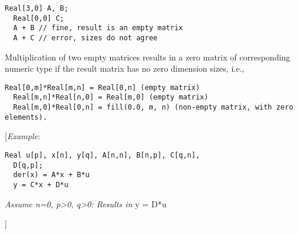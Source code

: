\begin{lstlisting}[language=modelica]
  Real[3,0] A, B;
  Real[0,0] C;
  A + B // fine, result is an empty matrix
  A + C // error, sizes do not agree
\end{lstlisting}
Multiplication of two empty matrices results in a zero matrix of
corresponding numeric type if the result matrix has no zero dimension
sizes, i.e.,

\begin{lstlisting}[language=modelica]
  Real[0,m]*Real[m,n] = Real[0,n] (empty matrix)
  Real[m,n]*Real[n,0] = Real[m,0] (empty matrix)
  Real[m,0]*Real[0,n] = fill(0.0, m, n) (non-empty matrix, with zero elements).
\end{lstlisting}
{[}\emph{Example}:

\begin{lstlisting}[language=modelica]
  Real u[p], x[n], y[q], A[n,n], B[n,p], C[q,n],
  D[q,p];
  der(x) = A*x + B*u
  y = C*x + D*u
\end{lstlisting}
\emph{Assume n=0, p\textgreater{}0, q\textgreater{}0: Results in} y =
D*u

{]}
